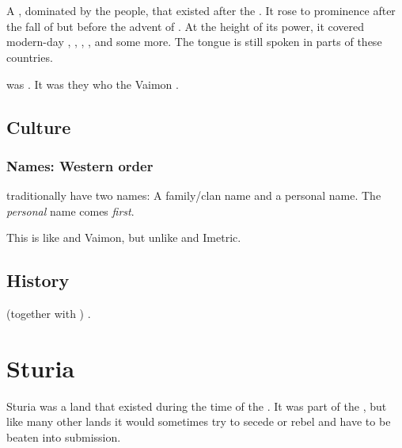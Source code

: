 \section{\Tepharae}
A , dominated by the  people, that existed after the . 
It rose to prominence after the fall of  but before the advent of . 
At the height of its power, it covered modern-day , , , ,  and some more. 
The \Tepharin{} tongue is still spoken in parts of these countries. 

\Tepharae{} was . 
It was they who  the Vaimon . 









\subsection{Culture}
\subsubsection{Names: Western order}
\Ortaican{} traditionally have two names: 
A family/clan name and a personal name. 
The \emph{personal} name comes \emph{first}. 

This is like \Velcadian{} and Vaimon, but unlike \Ortaican{} and Imetric. 









\subsection{History}
\Tepharae (together with ) .















\section{Sturia}
Sturia was a land that existed during the time of the \VaimonCaliphate.
It was part of the \caliphate, but like many other lands it would sometimes try to secede or rebel and have to be beaten into submission.


